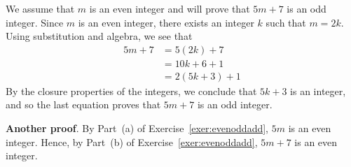 

\begin{list}{\bf{\ref{exer:5m+7}.}}
\item \begin{list}{\bf{(a)}} 
\item We assume that $m$ is an even integer and will prove that $5m + 7$ is an odd integer.  Since $m$ is an even integer, there exists an integer $k$ such that $m = 2k$.  Using substitution and algebra, we see that
\begin{align*}
5m + 7 &= 5(2k) + 7 \\
           &= 10k + 6 + 1 \\
           &= 2(5k + 3) + 1
\end{align*}
By the closure properties of the integers, we conclude that $5k + 3$ is an integer, and so the last equation proves that $5m + 7$ is an odd integer.

\textbf{Another proof}.  
By Part~(a) of Exercise~\ref{exer:evenoddadd}, $5m$ is an even integer.  Hence, by Part~(b) of 
Exercise~\ref{exer:evenoddadd}, $5m + 7$ is an even integer.
\end{list}
\end{list}
%
%


